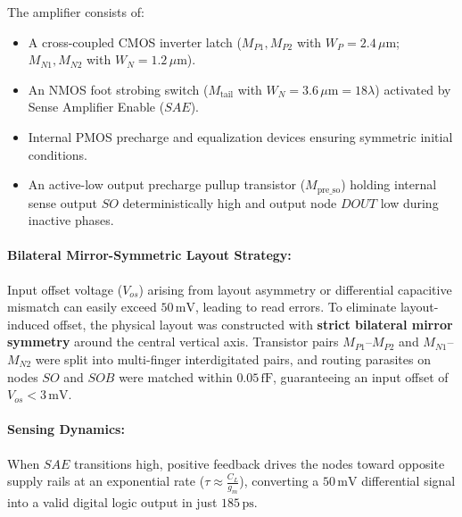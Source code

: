 \documentclass[10pt,a4paper,titlepage]{article}
\begin{document}
The amplifier consists of:
\begin{itemize}[itemsep=2pt]
    \item A cross-coupled CMOS inverter latch ($M_{P1}, M_{P2}$ with $W_P = 2.4\,\mu\text{m}$; $M_{N1}, M_{N2}$ with $W_N = 1.2\,\mu\text{m}$).
    \item An NMOS foot strobing switch ($M_{\text{tail}}$ with $W_N = 3.6\,\mu\text{m} = 18\lambda$) activated by Sense Amplifier Enable ($SAE$).
    \item Internal PMOS precharge and equalization devices ensuring symmetric initial conditions.
    \item An active-low output precharge pullup transistor ($M_{\text{pre\_so}}$) holding internal sense output $SO$ deterministically high and output node $DOUT$ low during inactive phases.
\end{itemize}

\paragraph{Bilateral Mirror-Symmetric Layout Strategy:} Input offset voltage ($V_{os}$) arising from layout asymmetry or differential capacitive mismatch can easily exceed $50\,\text{mV}$, leading to read errors. To eliminate layout-induced offset, the physical layout was constructed with \textbf{strict bilateral mirror symmetry} around the central vertical axis. Transistor pairs $M_{P1}$--$M_{P2}$ and $M_{N1}$--$M_{N2}$ were split into multi-finger interdigitated pairs, and routing parasites on nodes $SO$ and $SOB$ were matched within $0.05\,\text{fF}$, guaranteeing an input offset of $V_{os} < 3\,\text{mV}$.

\paragraph{Sensing Dynamics:} When $SAE$ transitions high, positive feedback drives the nodes toward opposite supply rails at an exponential rate ($\tau \approx \frac{C_L}{g_m}$), converting a $50\,\text{mV}$ differential signal into a valid digital logic output in just \textbf{$185\,\text{ps}$}.
\end{document}
